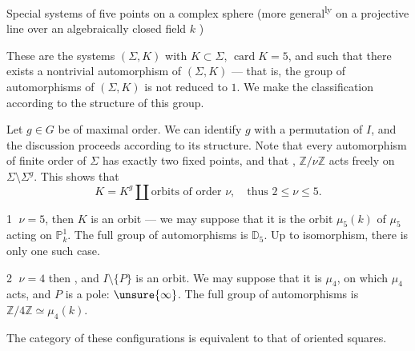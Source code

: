 Special systems of five points on a complex sphere (more general\textsuperscript{ly} on a  projective line over an algebraically closed field \(k\) )

These are the systems \((\Sigma,K)\) with \(K\subset\Sigma\), \(\operatorname{card}K=5\), and such that there exists a nontrivial automorphism of \((\Sigma,K)\) --- that is, the group  of automorphisms of \((\Sigma,K)\) is not reduced to \(1\). We make the classification according to the structure of this group.

Let \(g\in G\) be of maximal order. We can identify \(g\) with a permutation of \(I\), and the discussion proceeds according to its structure. Note that  every automorphism of finite order of \(\Sigma\)  has exactly two fixed points, and that  , \(\mathbb Z/\nu\mathbb Z\) acts freely on \(\Sigma\setminus\Sigma^g\). This shows that
\[
K=K^g\amalg\text{orbits of order }\nu,\quad\text{thus }2\leq\nu\leq5.
\]

\textcircled{1} \(\nu=5\), then \(K\) is an orbit --- we may suppose that it is the orbit \(\mu_5(k)\) of \(\mu_5\) acting on \(\mathbb P^1_k\). The full group of automorphisms is \(\mathbb D_5\). Up to isomorphism, there is only one such case.


\textcircled{2} \(\nu=4\) then  , and \(I\setminus\{P\}\) is an orbit. We may suppose that it is \(\mu_4\), on which \(\mu_4\) acts, and \(P\) is a pole: \(\unsure{\infty}\). The full group of automorphisms is \(\mathbb Z/4\mathbb Z\simeq\mu_4(k)\).

The category of these configurations is equivalent to that of oriented squares.


